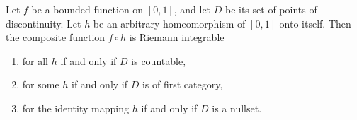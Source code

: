 Let $f$ be a bounded function on $[0, 1]$, and let $D$ be its set of points of discontinuity. Let $h$ be an arbitrary homeomorphism of $[0, 1]$ onto itself. Then the composite function $f \circ h$ is Riemann integrable
\begin{enumerate}
\item[(a)] for all $h$ if and only if $D$ is countable,
\item[(b)] for some $h$ if and only if $D$ is of first category,
\item[(c)] for the identity mapping $h$ if and only if $D$ is a nullset.
\end{enumerate}
